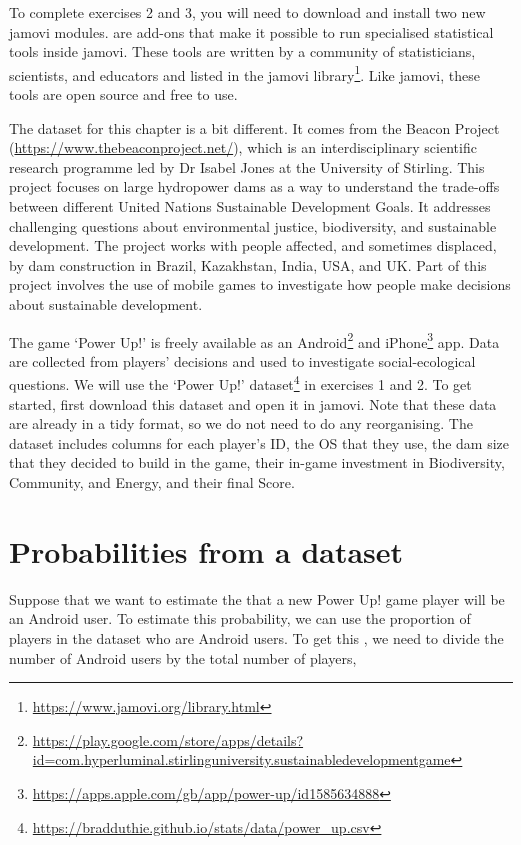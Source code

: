 \documentclass[
  openany]{krantz}
\renewcommand{\href}[2]{#2\footnote{\url{#1}}}
\begin{document}
To complete exercises 2 and 3, you will need to download and install two new jamovi modules.
 are add-ons that make it possible to run specialised statistical tools inside jamovi.
These tools are written by a community of statisticians, scientists, and educators and listed in the \href{https://www.jamovi.org/library.html}{jamovi library}.
Like jamovi, these tools are open source and free to use.

The dataset for this chapter is a bit different.
It comes from the Beacon Project (\url{https://www.thebeaconproject.net/}), which is an interdisciplinary scientific research programme led by Dr Isabel Jones at the University of Stirling.
This project focuses on large hydropower dams as a way to understand the trade-offs between different United Nations Sustainable Development Goals.
It addresses challenging questions about environmental justice, biodiversity, and sustainable development.
The project works with people affected, and sometimes displaced, by dam construction in Brazil, Kazakhstan, India, USA, and UK.
Part of this project involves the use of mobile games to investigate how people make decisions about sustainable development.

The game `Power Up!' is freely available as an \href{https://play.google.com/store/apps/details?id=com.hyperluminal.stirlinguniversity.sustainabledevelopmentgame}{Android} and \href{https://apps.apple.com/gb/app/power-up/id1585634888}{iPhone} app.
Data are collected from players' decisions and used to investigate social-ecological questions.
We will use the `Power Up!' dataset\footnote{\url{https://bradduthie.github.io/stats/data/power_up.csv}} in exercises 1 and 2.
To get started, first download this dataset and open it in jamovi.
Note that these data are already in a tidy format, so we do not need to do any reorganising.
The dataset includes columns for each player's ID, the OS that they use, the dam size that they decided to build in the game, their in-game investment in Biodiversity, Community, and Energy, and their final Score.

\hypertarget{probabilities-from-a-dataset}{%
\section{Probabilities from a dataset}\label{probabilities-from-a-dataset}}

Suppose that we want to estimate the  that a new Power Up! game player will be an Android user.
To estimate this probability, we can use the proportion of players in the dataset who are Android users.
To get this , we need to divide the number of Android users by the total number of players,
\end{document}
